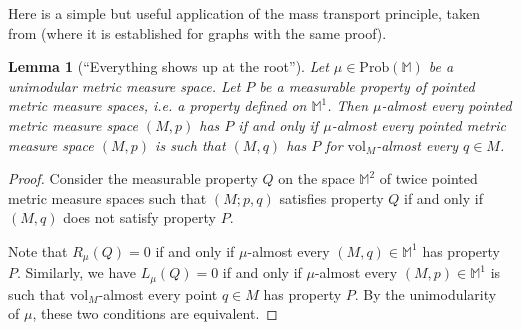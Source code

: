 \documentclass{amsart}
\newcommand{\RR}{\mathbb{R}}
\newcommand{\MM}{\mathbb{M}}
\newcommand{\vol}{\mathrm{vol}}
\newcommand{\Prob}[1]{\mathrm{Prob}\left(#1\right)}
\newcommand{\Ends}[1]{\mathcal{E}\left(#1\right)}
\theoremstyle{plain}
\newtheorem{lemma}[theorem]{Lemma}
\newtheorem{prop}[theorem]{Proposition}
\numberwithin{equation}{section}
\theoremstyle{definition}
\begin{document}
Here is a simple but useful application of the mass transport principle, taken from \cite{aldous2007processes} (where it is established for graphs with the same proof).

\begin{lemma}[\enquote{Everything shows up at the root}]
\label{lemma: everything shows up at the root}
Let $\mu \in \Prob{\MM}$ be a unimodular metric measure space. Let $P$ be a measurable property of pointed metric measure spaces, i.e. a property defined on $\MM^1$. Then $\mu$-almost every pointed metric measure space $(M,p)$ has $P$ if and only if $\mu$-almost every pointed metric measure space $(M,p)$ is such that $(M,q)$ has $P$ for $\vol_M$-almost every $q \in M$.
\end{lemma}
\begin{proof}
Consider the measurable property $Q$ on the space $\MM^2$ of twice pointed metric measure spaces such that $(M;p,q)$ satisfies property $Q$  if and only if $(M,q)$ does not satisfy property $P$. 


Note that  $R_\mu(Q)=0$ if and only if $\mu$-almost every $(M,q)\in \MM^1$ has property $P$.
Similarly, we have $L_\mu(Q) = 0$ if and only if $\mu$-almost every $(M,p)\in \MM^1$ is such that $\mathrm{vol}_M$-almost every point  $q \in M$ has property $P$. 
By the unimodularity of $\mu$, these two conditions are equivalent.
\end{proof}


\end{document}
